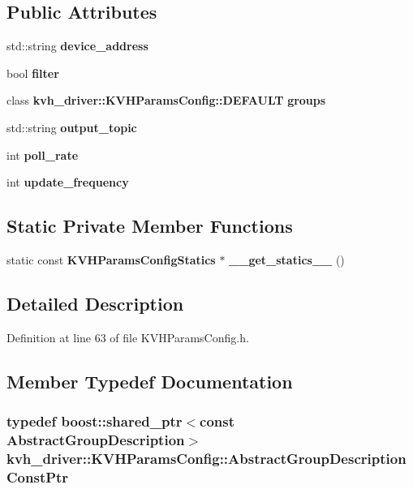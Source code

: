 \subsection*{\-Public \-Attributes}
\begin{DoxyCompactItemize}
\item 
std\-::string {\bf device\-\_\-address}
\item 
bool {\bf filter}
\item 
class \*
{\bf kvh\-\_\-driver\-::\-K\-V\-H\-Params\-Config\-::\-D\-E\-F\-A\-U\-L\-T} {\bf groups}
\item 
std\-::string {\bf output\-\_\-topic}
\item 
int {\bf poll\-\_\-rate}
\item 
int {\bf update\-\_\-frequency}
\end{DoxyCompactItemize}
\subsection*{\-Static \-Private \-Member \-Functions}
\begin{DoxyCompactItemize}
\item 
static const \*
{\bf \-K\-V\-H\-Params\-Config\-Statics} $\ast$ {\bf \-\_\-\-\_\-get\-\_\-statics\-\_\-\-\_\-} ()
\end{DoxyCompactItemize}


\subsection{\-Detailed \-Description}


\-Definition at line 63 of file \-K\-V\-H\-Params\-Config.\-h.



\subsection{\-Member \-Typedef \-Documentation}
\subsubsection[{\-Abstract\-Group\-Description\-Const\-Ptr}]{\setlength{\rightskip}{0pt plus 5cm}typedef boost\-::shared\-\_\-ptr$<$const {\bf \-Abstract\-Group\-Description}$>$ {\bf kvh\-\_\-driver\-::\-K\-V\-H\-Params\-Config\-::\-Abstract\-Group\-Description\-Const\-Ptr}}\label{classkvh__driver_1_1KVHParamsConfig_a724498cfb3c20d6b635010531871a216}


